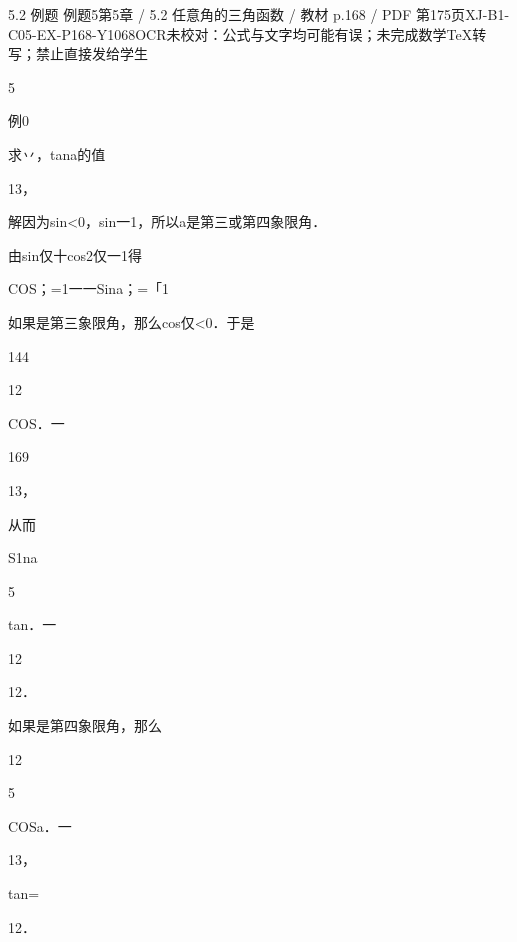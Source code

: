 \begin{bankitem}{5.2 例题 例题5}{第5章 / 5.2 任意角的三角函数 / 教材 p.168 / PDF 第175页}{XJ-B1-C05-EX-P168-Y1068}{OCR未校对：公式与文字均可能有误；未完成数学TeX转写；禁止直接发给学生}
\begin{ocrdraft}
\par
5
\par
例0
\par
求丷，tana的值
\par
13，
\par
解因为sin<0，sin一1，所以a是第三或第四象限角．
\par
由sin仅十cos2仅一1得
\par
COS；=1一一Sina；=「1
\par
如果是第三象限角，那么cos仅<0．于是
\par
144
\par
12
\par
COS．一
\par
169
\par
13，
\par
从而
\par
S1na
\par
5
\par
tan．一
\par
12
\par
12．
\par
如果是第四象限角，那么
\par
12
\par
5
\par
COSa．一
\par
13，
\par
tan=
\par
12．
\end{ocrdraft}
\end{bankitem}
